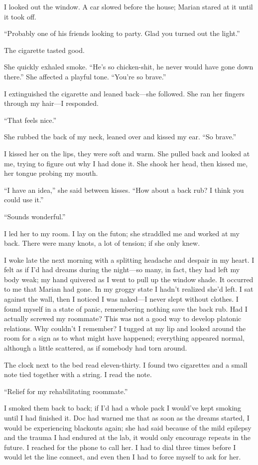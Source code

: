I looked out the window. A car slowed before the house; Marian stared at
it until it took off.

``Probably one of his friends looking to party. Glad you turned out the
light.''

The cigarette tasted good.

She quickly exhaled smoke. ``He's so chicken-shit, he never would have
gone down there.'' She affected a playful tone. ``You're so brave.''

I extinguished the cigarette and leaned back---she followed. She ran her
fingers through my hair---I responded.

``That feels nice.''

She rubbed the back of my neck, leaned over and kissed my ear. ``So
brave.''

I kissed her on the lips, they were soft and warm. She pulled back and
looked at me, trying to figure out why I had done it. She shook her
head, then kissed me, her tongue probing my mouth.

``I have an idea,'' she said between kisses. ``How about a back rub? I
think you could use it.''

``Sounds wonderful.''

I led her to my room. I lay on the futon; she straddled me and worked at
my back. There were many knots, a lot of tension; if she only knew.

I woke late the next morning with a splitting headache and despair in my
heart. I felt as if I'd had dreams during the night---so many, in fact,
they had left my body weak; my hand quivered as I went to pull up the
window shade. It occurred to me that Marian had gone. In my groggy state
I hadn't realized she'd left. I sat against the wall, then I noticed I
was naked---I never slept without clothes. I found myself in a state of
panic, remembering nothing save the back rub. Had I actually screwed my
roommate? This was not a good way to develop platonic relations. Why
couldn't I remember? I tugged at my lip and looked around the room for a
sign as to what might have happened; everything appeared normal,
although a little scattered, as if somebody had torn around.

The clock next to the bed read eleven-thirty. I found two cigarettes and
a small note tied together with a string. I read the note.

``Relief for my rehabilitating roommate.''

I smoked them back to back; if I'd had a whole pack I would've kept
smoking until I had finished it. Doc had warned me that as soon as the
dreams started, I would be experiencing blackouts again; she had said
because of the mild epilepsy and the trauma I had endured at the lab, it
would only encourage repeats in the future. I reached for the phone to
call her. I had to dial three times before I would let the line connect,
and even then I had to force myself to ask for her.


